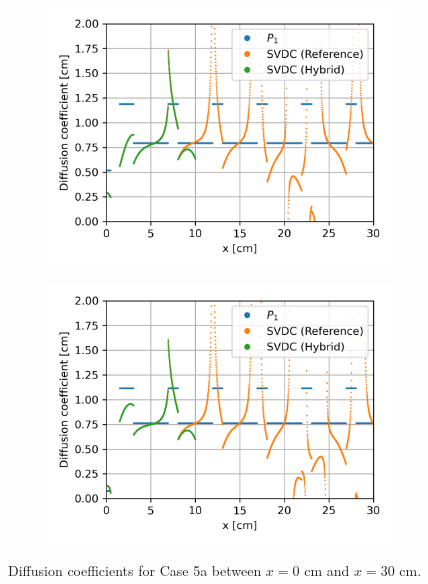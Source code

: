 \begin{frame}
\begin{figure}
\begin{subfigure}[t]{.35\textwidth}
      \centering
      \includegraphics[width=\textwidth]{../images/case-5a-group-3-diffcoef}
      \label{fig:c5ag3dc}
    \end{subfigure}
    \begin{subfigure}[t]{.35\textwidth}
      \centering
      \includegraphics[width=\textwidth]{../images/case-5a-group-4-diffcoef}
      \label{fig:c5ag4dc}
    \end{subfigure}
    \caption{Diffusion coefficients for Case 5a between $x=0$ cm and $x=30$ cm.}
    \label{fig:c5adiffcoef}
  \end{figure}
\end{frame}

